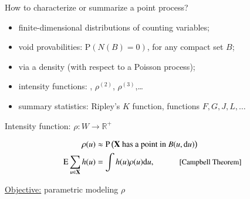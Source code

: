 \documentclass[serif]{beamer}
\newcommand{\E}{\mathrm E}
\newcommand{\bX}{\mathbf{X}}
\newcommand{\R}{\mathbb R}
\newcommand{\dd}{\mathrm d}
\begin{document}
\begin{frame}{How to characterize or summarize a point process?}

\begin{itemize}
	\item finite-dimensional distributions of counting variables;
	\item void provabilities: $\mathrm P(N(B)=0)$, for any compact set $B$;
	\item via a density (with respect to a Poisson process);
	\item intensity functions: \fbox{\;{$\rho$}\;}, $\rho^{(2)}$, $\rho^{(3)}$,\dots
	\item summary statistics: Ripley's $K$ function, functions $F,G,J,L,\dots$
\end{itemize}




\begin{block}{Intensity function: $\rho  : W \to \R^+$}

\vspace*{-.8cm}

\begin{align*}
\rho (u) &\approx \mathrm P \left( \bX \text{ has a point in } B(u,\dd u) \right)\\
\E \sum_{u \in \bX} h(u) & = \int h(u) \rho(u) \dd u, \quad \qquad \text{\small [Campbell Theorem]}
\end{align*}
\end{block}	


\underline{Objective:} parametric modeling $\rho$ 


\end{frame}
\end{document}
